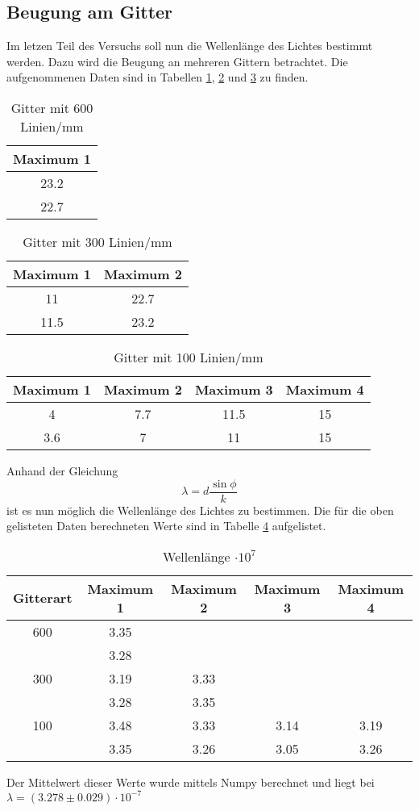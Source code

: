 \subsection{Beugung am Gitter}
  Im letzen Teil des Versuchs soll nun die Wellenlänge des Lichtes bestimmt werden. Dazu 
  wird die Beugung an mehreren Gittern betrachtet. Die aufgenommenen Daten sind in Tabellen \ref{tab:gitter1},
  \ref{tab:gitter2} und \ref{tab:gitter3} zu finden.
  \begin{table}[H]
    \centering
    \caption{Gitter mit 600 Linien/mm}
    \begin{tabular}{c}
      \toprule
      Maximum 1\\
      \midrule
      23.2 \\
      22.7 \\
      \bottomrule
    \end{tabular}
    \label{tab:gitter1}
  \end{table}
  \begin{table}[H]
    \centering
    \caption{Gitter mit 300 Linien/mm}
    \begin{tabular}{c c}
      \toprule
      Maximum 1 & Maximum 2\\
      \midrule
      11   & 22.7 \\
      11.5 & 23.2 \\
      \bottomrule
    \end{tabular}
    \label{tab:gitter2}
  \end{table}
  \begin{table}[H]
    \centering
    \caption{Gitter mit 100 Linien/mm}
    \begin{tabular}{c c c c}
      \toprule
      Maximum 1 & Maximum 2 & Maximum 3 & Maximum 4\\
      \midrule
      4   & 7.7 & 11.5 & 15 \\
      3.6 & 7   & 11   & 15 \\
      \bottomrule
    \end{tabular}
    \label{tab:gitter3}
  \end{table}
  \noindent Anhand der Gleichung 
  \begin{equation*}
    \lambda = d \dfrac{\sin{\phi}}{k}
  \end{equation*}
  ist es nun möglich die Wellenlänge des Lichtes zu bestimmen. Die für die oben 
  gelisteten Daten berechneten Werte sind in Tabelle \ref{tab:wellen} aufgelistet.
  \begin{table}[H]
    \centering
    \caption{Wellenlänge $\cdot 10^{7}$}
    \begin{tabular}{c c c c c}
      \toprule
      Gitterart & Maximum 1 & Maximum 2 & Maximum 3 & Maximum 4\\
      \midrule
      600&3.35   &&&\\
      &3.28&&&\\
      300&3.19& 3.33&& \\
      &3.28&3.35&&\\
      100&  3.48   &   3.33&  3.14&3.19 \\
      &3.35&3.26&3.05&3.26\\
      \bottomrule
    \end{tabular}
    \label{tab:wellen}
  \end{table}
  \noindent Der Mittelwert dieser Werte wurde mittels Numpy berechnet und liegt bei 
  $\lambda=(3.278\pm0.029)\cdot 10^{-7}$